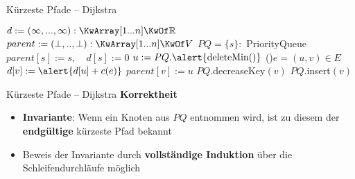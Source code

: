 \begin{frame}{Kürzeste Pfade – Dijkstra}  \vspace{-.25\baselineskip}
	\begin{exampleblock}{} \vspace{-.4\baselineskip}
		\begin{algorithm}[H]
			\small
			 {
				$d := (\infty, ..., \infty) : \KwArray[1...n] \KwOf \R$\;
				$parent := (\bot, .., \bot) : \KwArray[1...n] \KwOf V$\;
				$PQ = \{s\} : $ \alert{PriorityQueue}\;
				$parent[s] := s, \quad d[s] := 0$ \;
				 {
					$u := PQ.\alert{\|deleteMin|()}$  \;
					\ForEach(){$e = (u, v) \in E$} {
						 {
							$d[v] := \alert{d[u] + c(e)}$\;
							$parent[v] := u$\;
							 {
								\alert{$PQ.$decreaseKey$(v)$}\;
							}{
								$PQ.$insert$(v)$\;
							} \vspace{-.2\baselineskip}
						} \vspace{-.2\baselineskip}
					} \vspace{-.2\baselineskip}
				}
				\;
			}
		\end{algorithm} \vspace{-.4\baselineskip}
	\end{exampleblock}
\end{frame}

\begin{frame}{Kürzeste Pfade – Dijkstra}
	\textbf{Korrektheit}
	\begin{itemize}
		\item \textbf{Invariante}: Wenn ein Knoten aus $PQ$ entnommen wird, ist zu diesem der \textbf{endgültige} kürzeste Pfad bekannt
		\pause
		\item Beweis der Invariante durch \textbf{vollständige Induktion} über die Schleifendurchläufe möglich
	\end{itemize}
\end{frame}

\iffalse

